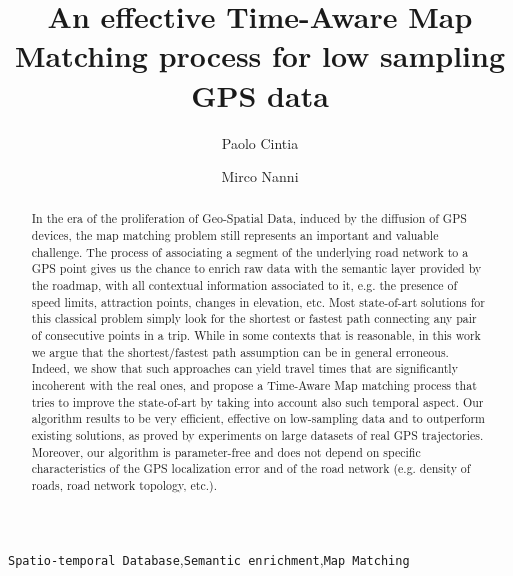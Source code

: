 \documentclass[5p]{elsarticle}
\begin{document}
\begin{frontmatter}

\title{An effective Time-Aware Map Matching process for low sampling GPS data}

\author[mymainaddress]{Paolo Cintia }



\author[mymainaddress]{Mirco Nanni}





\address[mymainaddress]{KDD-Lab Isti CNR - Via G. Moruzzi 1, Pisa - Italy}

\begin{abstract}
In the era of the proliferation of Geo-Spatial Data, induced by
the diffusion of GPS devices, the map matching problem still 
represents an important and valuable challenge. The process of associating
a segment of the underlying road network to a GPS point gives us the chance to enrich raw data with the semantic layer provided by the roadmap, with all contextual 
information associated to it, e.g. the presence of speed limits, attraction points, changes in elevation, etc.
Most state-of-art solutions for this classical problem simply look for 
the shortest or fastest path connecting any pair of consecutive 
points in a trip.
While in some contexts that is reasonable, in this work we argue that
the shortest/fastest path assumption can be in general erroneous. 
Indeed, we show that such approaches can yield travel times 
that are significantly incoherent with the real ones, and 
propose a Time-Aware Map matching process that tries to improve 
the state-of-art by taking into account also such temporal aspect. 
Our algorithm results to be very efficient, effective on low-sampling 
data and to outperform existing solutions, as proved by experiments on  
large datasets of real GPS trajectories. 
Moreover, our algorithm is parameter-free and does not depend on specific 
characteristics of the GPS localization error and of the road network (e.g. density
of roads, road network topology, etc.).
\end{abstract}

\begin{keyword}
\texttt{Spatio-temporal Database},\texttt{Semantic enrichment},\texttt{Map Matching}

\end{keyword}

\end{frontmatter}
\end{document}
